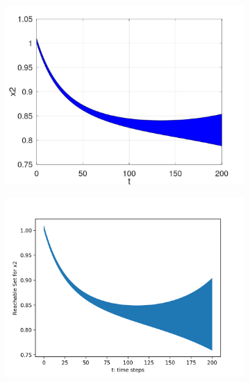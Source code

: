 \documentclass[EPiC]{easychair}
\begin{document}
\begin{figure}[h]
    \begin{subfigure}{0.47\textwidth}
    \centering
    \includegraphics[width=\textwidth]{SapoFigures/Phos/SapoPhos_X2.jpg}
    \end{subfigure}
    \begin{subfigure}{0.47\textwidth}
    \centering
    \includegraphics[width=1.1\textwidth,height=0.82\textwidth]{SapoFigures/Phos/KaaPhos_X2.png}
    \end{subfigure}
    

\end{figure}
\end{document}
